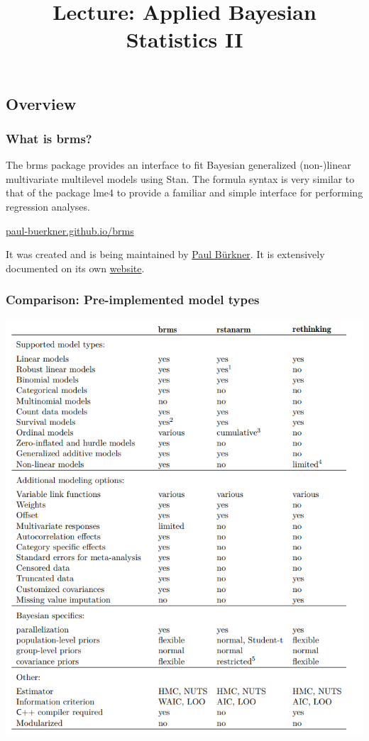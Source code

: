 \documentclass[
  11pt,
]{article}
\title{Lecture: Applied Bayesian Statistics II}
\author{}
\date{\vspace{-2.5em}}
\begin{document}
\maketitle

\hypertarget{overview}{%
\subsection{Overview}\label{overview}}

\hypertarget{what-is-brms}{%
\subsubsection{What is brms?}\label{what-is-brms}}

The brms package provides an interface to fit Bayesian generalized (non-)linear multivariate multilevel models using Stan. The formula syntax is very similar to that of the package lme4 to provide a familiar and simple interface for performing regression analyses.

\href{https://paul-buerkner.github.io/brms}{paul-buerkner.github.io/brms}

It was created and is being maintained by \href{https://paul-buerkner.github.io/}{Paul Bürkner}. It is extensively documented on its own \href{https://paul-buerkner.github.io/brms/}{website}.

\hypertarget{comparison-pre-implemented-model-types}{%
\subsubsection{Comparison: Pre-implemented model types}\label{comparison-pre-implemented-model-types}}

\begin{center}\includegraphics[width=0.8\linewidth]{images/canned} \end{center}
\end{document}
